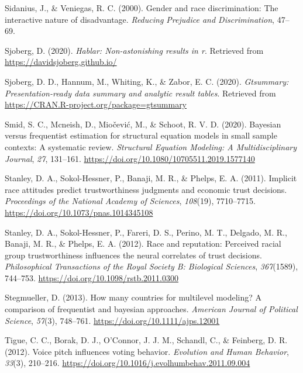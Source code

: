 \documentclass[
  english,
  man, noextraspace,floatsintext]{apa6}
\newlength{\cslhangindent}
\newenvironment{cslreferences}%
  {\setlength{\parindent}{0pt}%
  \everypar{\setlength{\hangindent}{\cslhangindent}}\ignorespaces}%
  {\par}
\begin{document}
\begin{cslreferences}
\leavevmode\hypertarget{ref-Sidanius2000}{}%
Sidanius, J., \& Veniegas, R. C. (2000). Gender and race discrimination: The interactive nature of disadvantage. \emph{Reducing Prejudice and Discrimination}, 47--69.

\leavevmode\hypertarget{ref-R-hablar}{}%
Sjoberg, D. (2020). \emph{Hablar: Non-astonishing results in r}. Retrieved from \url{https://davidsjoberg.github.io/}

\leavevmode\hypertarget{ref-R-gtsummary}{}%
Sjoberg, D. D., Hannum, M., Whiting, K., \& Zabor, E. C. (2020). \emph{Gtsummary: Presentation-ready data summary and analytic result tables}. Retrieved from \url{https://CRAN.R-project.org/package=gtsummary}

\leavevmode\hypertarget{ref-Smid2020}{}%
Smid, S. C., Mcneish, D., Miočević, M., \& Schoot, R. V. D. (2020). Bayesian versus frequentist estimation for structural equation models in small sample contexts: A systematic review. \emph{Structural Equation Modeling: A Multidisciplinary Journal}, \emph{27}, 131--161. \url{https://doi.org/10.1080/10705511.2019.1577140}

\leavevmode\hypertarget{ref-Stanley2011}{}%
Stanley, D. A., Sokol-Hessner, P., Banaji, M. R., \& Phelps, E. A. (2011). Implicit race attitudes predict trustworthiness judgments and economic trust decisions. \emph{Proceedings of the National Academy of Sciences}, \emph{108}(19), 7710--7715. \url{https://doi.org/10.1073/pnas.1014345108}

\leavevmode\hypertarget{ref-Stanley2012}{}%
Stanley, D. A., Sokol-Hessner, P., Fareri, D. S., Perino, M. T., Delgado, M. R., Banaji, M. R., \& Phelps, E. A. (2012). Race and reputation: Perceived racial group trustworthiness influences the neural correlates of trust decisions. \emph{Philosophical Transactions of the Royal Society B: Biological Sciences}, \emph{367}(1589), 744--753. \url{https://doi.org/10.1098/rstb.2011.0300}

\leavevmode\hypertarget{ref-Stegmueller2013}{}%
Stegmueller, D. (2013). How many countries for multilevel modeling? A comparison of frequentist and bayesian approaches. \emph{American Journal of Political Science}, \emph{57}(3), 748--761. \url{https://doi.org/10.1111/ajps.12001}

\leavevmode\hypertarget{ref-Tigue2012}{}%
Tigue, C. C., Borak, D. J., O'Connor, J. J. M., Schandl, C., \& Feinberg, D. R. (2012). Voice pitch influences voting behavior. \emph{Evolution and Human Behavior}, \emph{33}(3), 210--216. \url{https://doi.org/10.1016/j.evolhumbehav.2011.09.004}


\end{cslreferences}
\end{document}
